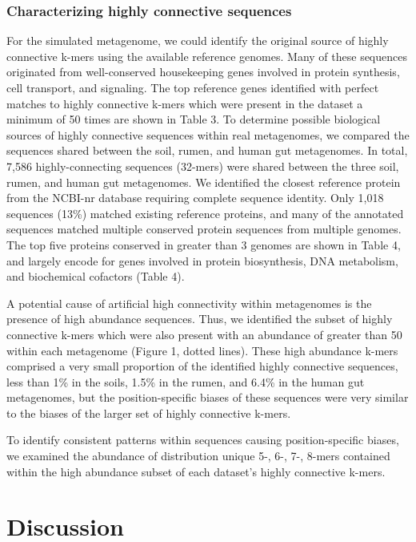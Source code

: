 \documentclass[11pt]{article} %
\begin{document}
\subsubsection{Characterizing highly connective sequences}

For the simulated metagenome, we could identify the original source of highly connective k-mers using the available reference genomes.  Many of these sequences originated from well-conserved housekeeping genes involved in protein synthesis, cell transport, and signaling.  The top reference genes identified with perfect matches to highly connective k-mers which were present in the dataset a minimum of 50 times are shown in Table 3.  To determine possible biological sources of highly connective sequences within real metagenomes, we compared the sequences shared between the soil, rumen, and human gut metagenomes.  In total, 7,586 highly-connecting sequences (32-mers) were shared between the three soil, rumen, and human gut metagenomes.  We identified the closest reference protein from the NCBI-nr database requiring complete sequence identity.  Only 1,018 sequences (13\%) matched existing reference proteins, and many of the annotated sequences matched multiple conserved protein sequences from multiple genomes.  The top five proteins conserved in greater than 3 genomes are shown in Table 4, and largely encode for genes involved in protein biosynthesis, DNA metabolism, and biochemical cofactors (Table 4).

A potential cause of artificial high connectivity within metagenomes is the presence of high abundance sequences.  Thus, we identified the subset of highly connective k-mers which were also present with an abundance of greater than 50 within each metagenome (Figure 1, dotted lines).   These high abundance k-mers comprised a very small proportion of the identified highly connective sequences, less than 1\% in the soils, 1.5\% in the rumen, and 6.4\% in the human gut metagenomes, but the position-specific biases of these sequences were very similar to the biases of the larger set of highly connective k-mers.

To identify consistent patterns within sequences causing position-specific biases, we examined the abundance of distribution unique 5-, 6-, 7-, 8-mers contained within the high abundance subset of each dataset's highly connective k-mers. 

\section{Discussion}
\end{document}
